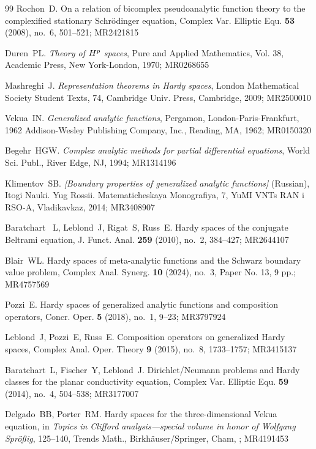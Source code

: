 \documentclass[suppldata]{interact}
\DeclareRobustCommand\cyr{\fontencoding{OT2}\selectfont}
\theoremstyle{plain}%
\theoremstyle{definition}
\theoremstyle{remark}
\begin{document}
\begin{thebibliography}{99}
Rochon~D. On a relation of bicomplex pseudoanalytic function theory to the complexified stationary Schr\"odinger equation, Complex Var. Elliptic Equ. {\bf 53} (2008), no.~6, 501--521; MR2421815

Duren~PL. {\it Theory of $H\sp{p}$ spaces}, Pure and Applied Mathematics, Vol. 38, Academic Press, New York-London, 1970; MR0268655

Mashreghi~J. {\it Representation theorems in Hardy spaces}, London Mathematical Society Student Texts, 74, Cambridge Univ. Press, Cambridge, 2009; MR2500010

Vekua~IN. {\it Generalized analytic functions}, Pergamon, London-Paris-Frankfurt, 1962 Addison-Wesley Publishing Company, Inc., Reading, MA, 1962; MR0150320

Begehr~HGW. {\it Complex analytic methods for partial differential equations}, World Sci. Publ., River Edge, NJ, 1994; MR1314196

Klimentov~SB. {\it [Boundary properties of generalized analytic functions]} (Russian), {\cyr Itogi Nauki. Yug Rossii. Matematicheskaya Monografiya}, 7, YuMI VNTs RAN i RSO-A, Vladikavkaz, 2014; MR3408907

Baratchart~ L, Leblond~J, Rigat~S, Russ~E. Hardy spaces of the conjugate Beltrami equation, J. Funct. Anal. {\bf 259} (2010), no.~2, 384--427; MR2644107

Blair~WL. Hardy spaces of meta-analytic functions and the Schwarz boundary value problem, Complex Anal. Synerg. {\bf 10} (2024), no.~3, Paper No. 13, 9 pp.; MR4757569

Pozzi~E. Hardy spaces of generalized analytic functions and composition operators, Concr. Oper. {\bf 5} (2018), no.~1, 9--23; MR3797924

Leblond~J, Pozzi~E, Russ~E. Composition operators on generalized Hardy spaces, Complex Anal. Oper. Theory {\bf 9} (2015), no.~8, 1733--1757; MR3415137

Baratchart~L, Fischer~Y, Leblond~J. Dirichlet/Neumann problems and Hardy classes for the planar conductivity equation, Complex Var. Elliptic Equ. {\bf 59} (2014), no.~4, 504--538; MR3177007	

Delgado~BB, Porter~RM. Hardy spaces for the three-dimensional Vekua equation, in {\it Topics in Clifford analysis---special volume in honor of Wolfgang Spr\"o\ss ig}, 125--140, Trends Math., Birkh\"auser/Springer, Cham, ; MR4191453


\end{thebibliography}
\end{document}
